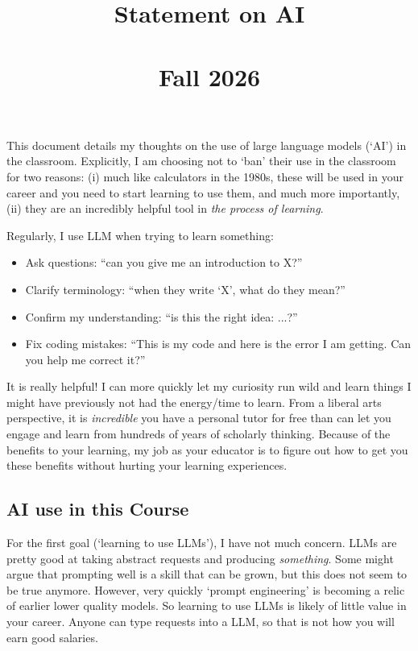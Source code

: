 \documentclass[12pt]{article}
\title{
  \vspace{-2em}
	{\huge \ttfamily Statement on AI} \\[-0.75em]
  {\Large \ttfamily [ECON 5783]} \\[-0.5em]
	{\Large Fall 2026}
}
\author{}
\date{}  %
\begin{document}
\maketitle

This document details my thoughts on the use of large language models (`AI') in the classroom. 
Explicitly, I am choosing not to `ban' their use in the classroom for two reasons:
(i) much like calculators in the 1980s, these will be used in your career and you need to start learning to use them, and much more importantly, 
(ii) they are an incredibly helpful tool in \emph{the process of learning}.

Regularly, I use LLM when trying to learn something:
\begin{itemize}
  \item Ask questions: ``can you give me an introduction to X?''
  
  \item Clarify terminology: ``when they write `X', what do they mean?''
  
  \item Confirm my understanding: ``is this the right idea: ...?''
  
  \item Fix coding mistakes: ``This is my code and here is the error I am getting. Can you help me correct it?''
\end{itemize} 

It is really helpful! 
I can more quickly let my curiosity run wild and learn things I might have previously not had the energy/time to learn. 
From a liberal arts perspective, it is \emph{incredible} you have a personal tutor for free than can let you engage and learn from hundreds of years of scholarly thinking.
Because of the benefits to your learning, my job as your educator is to figure out how to get you these benefits without hurting your learning experiences.

\subsection*{AI use in this Course}

For the first goal (`learning to use LLMs'), I have not much concern. 
LLMs are pretty good at taking abstract requests and producing \emph{something}. 
Some might argue that prompting well is a skill that can be grown, but this does not seem to be true anymore.
However, very quickly `prompt engineering' is becoming a relic of earlier lower quality models. 
So learning to use LLMs is likely of little value in your career. 
Anyone can type requests into a LLM, so that is not how you will earn good salaries.
\end{document}
